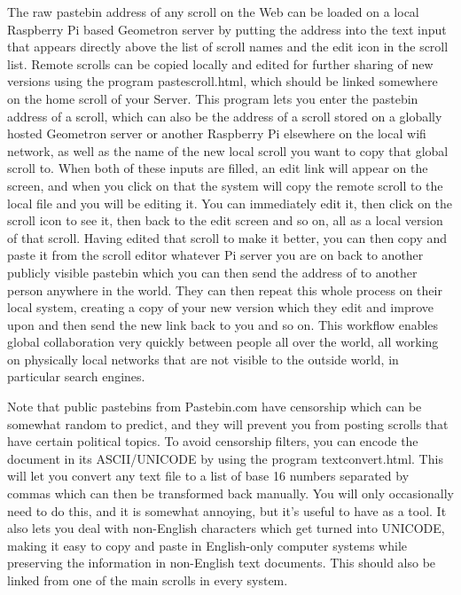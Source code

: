 The raw pastebin address of any scroll on the Web can be loaded on a local Raspberry Pi based Geometron server by putting the address into the text input that appears directly above the list of scroll names and the edit icon in the scroll list.  Remote scrolls can be copied locally and edited for further sharing of new versions using the program pastescroll.html, which should be linked somewhere on the home scroll of your Server.  This program lets you enter the pastebin address of a scroll, which can also be the address of a scroll stored on a globally hosted Geometron server or another Raspberry Pi elsewhere on the local wifi network, as well as the name of the new local scroll you want to copy that global scroll to.  When both of these inputs are filled, an edit link will appear on the screen, and when you click on that the system will copy the remote scroll to the local file and you will be editing it.  You can immediately edit it, then click on the scroll icon to see it, then back to the edit screen and so on, all as a local version of that scroll.   Having edited that scroll to make it better, you can then copy and paste it from the scroll editor whatever Pi server you are on back to another publicly visible pastebin which you can then send the address of to another person anywhere in the world.  They can then repeat this whole process on their local system, creating a copy of your new version which they edit and improve upon and then send the new link back to you and so on.  This workflow enables global collaboration very quickly between people all over the world, all working on physically local networks that are not visible to the outside world, in particular search engines. 

Note that public pastebins from Pastebin.com have censorship which can be somewhat random to predict, and they will prevent you from posting scrolls that have certain political topics.  To avoid censorship filters, you can encode the document in its ASCII/UNICODE by using the program textconvert.html.  This will let you convert any text file to a list of base 16 numbers separated by commas which can then be transformed back manually.  You will only occasionally need to do this, and it is somewhat annoying, but it's useful to have as a tool. It also lets you deal with non-English characters which get turned into UNICODE, making it easy to copy and paste in English-only computer systems while preserving the information in non-English text documents.  This should also be linked from one of the main scrolls in every system.

